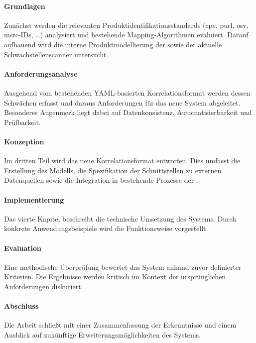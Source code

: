 \paragraph{Grundlagen}
Zunächst werden die relevanten Produktidentifikationsstandards (\acrshort{cpe}, \acrshort{purl}, \acrshort{osv}, \acrshort{msrc}-IDs, \ldots) analysiert und bestehende Mapping-Algorithmen evaluiert.
Darauf aufbauend wird die interne Produktmodellierung der \metaeffekt sowie der aktuelle Schwachstellenscanner untersucht.

\paragraph{Anforderungsanalyse}
Ausgehend vom bestehenden YAML-basierten Korrelationsformat werden dessen Schwächen erfasst und daraus Anforderungen für das neue System abgeleitet.
Besonderes Augenmerk liegt dabei auf Datenkonsistenz, Automatisierbarkeit und Prüfbarkeit.

\paragraph{Konzeption}
Im dritten Teil wird das neue Korrelationsformat entworfen.
Dies umfasst die Erstellung des Modells, die Spezifikation der Schnittstellen zu externen Datenquellen sowie die Integration in bestehende Prozesse der \metaeffekt.

\paragraph{Implementierung}
Das vierte Kapitel beschreibt die technische Umsetzung des Systems.
Durch konkrete Anwendungsbeispiele wird die Funktionsweise vorgestellt.

\paragraph{Evaluation}
Eine methodische Überprüfung bewertet das System anhand zuvor definierter Kriterien.
Die Ergebnisse werden kritisch im Kontext der ursprünglichen Anforderungen diskutiert.

\paragraph{Abschluss}
Die Arbeit schließt mit einer Zusammenfassung der Erkenntnisse und einem Ausblick auf zukünftige Erweiterungsmöglichkeiten des Systems.
